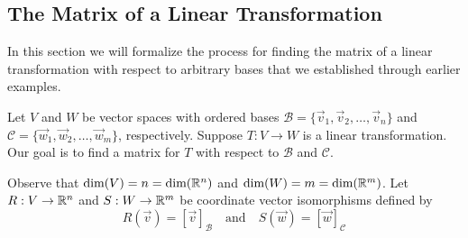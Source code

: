 \documentclass{ximera}
\begin{document}





\subsection{The Matrix of a Linear Transformation}
In this section we will formalize the process for finding the matrix of a linear transformation with respect to arbitrary bases that we established through earlier examples.

Let $V$ and $W$ be vector spaces with ordered bases $\mathcal{B}=\{\vec{v}_1, \vec{v}_2,\ldots ,\vec{v}_n\}$ and $\mathcal{C}=\{\vec{w}_1, \vec{w}_2,\ldots ,\vec{w}_m\}$, respectively.   Suppose $T:V\rightarrow W$ is a linear transformation.  Our goal is to find a matrix for $T$ with respect to $\mathcal{B}$ and $\mathcal{C}$.

Observe that $\text{dim}(V)=n=\text{dim}(\mathbb{R}^n)$ and $\text{dim}(W)=m=\text{dim}(\mathbb{R}^m)$. Let $R:V\rightarrow \mathbb{R}^n$ and $S:W\rightarrow \mathbb{R}^m$ be coordinate vector isomorphisms defined by
$$R(\vec{v})=[\vec{v}]_{\mathcal{B}}\quad\text{and}\quad S(\vec{w})=[\vec{w}]_{\mathcal{C}}$$
\end{document}
